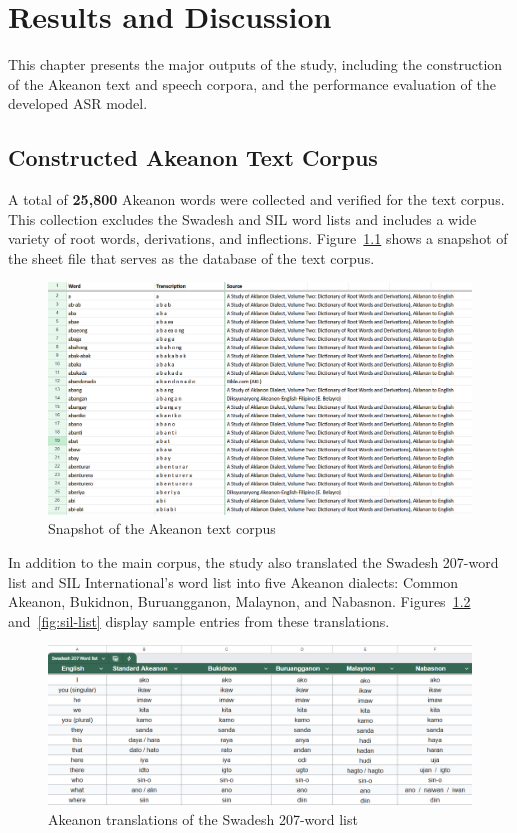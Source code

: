 \chapter{Results and Discussion}

This chapter presents the major outputs of the study, including the construction of the Akeanon text and speech corpora, and the performance evaluation of the developed ASR model.
\section{Constructed Akeanon Text Corpus}
A total of \textbf{25,800} Akeanon words were collected and verified for the text corpus. This collection excludes the Swadesh and SIL word lists and includes a wide variety of root words, derivations, and inflections. Figure~\ref{fig:text-corpus} shows a snapshot of the sheet file that serves as the database of the text corpus.

\begin{figure}[H]
    \centering
    \includegraphics[width=\textwidth]{./figures/text-corpus.png}
    \caption{Snapshot of the Akeanon text corpus}
    \label{fig:text-corpus}
\end{figure}

In addition to the main corpus, the study also translated the Swadesh 207-word list and SIL International's word list into five Akeanon dialects: Common Akeanon, Bukidnon, Buruangganon, Malaynon, and Nabasnon. Figures~\ref{fig:swadesh-list} and~\ref{fig:sil-list} display sample entries from these translations.

\begin{figure}[H]
    \centering
    \includegraphics[width=\textwidth]{./figures/swadesh.png}
    \caption{Akeanon translations of the Swadesh 207-word list}
    \label{fig:swadesh-list}
\end{figure}

